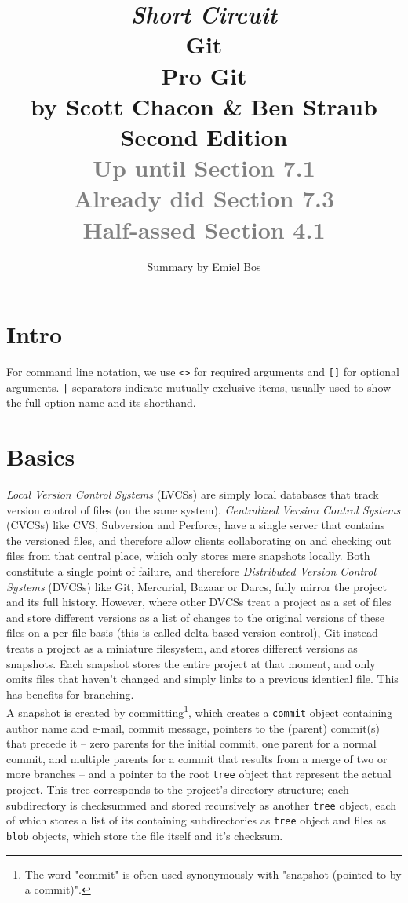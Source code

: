 \documentclass[8pt, table, xcdraw]{article}%
\title{
\textit{Short Circuit}\\
\vspace{15px}
\huge
Git\\
\vspace{20px}
\large
Pro Git\\
by Scott Chacon \& Ben Straub\\
Second Edition\\
\textcolor{gray}{Up until Section 7.1\\Already did Section 7.3\\Half-assed Section 4.1}
}
\author{Summary by Emiel Bos}
\date{}
\begin{document}
\maketitle

\section{Intro}

For command line notation, we use \lstinline{<>} for required arguments and \lstinline{[]} for optional arguments. \lstinline{|}-separators indicate mutually exclusive items, usually used to show the full option name and its shorthand.

\section{Basics}

\emph{Local Version Control Systems} (LVCSs) are simply local databases that track version control of files (on the same system). \emph{Centralized Version Control Systems} (CVCSs) like CVS, Subversion and Perforce, have a single server that contains the versioned files, and therefore allow clients collaborating on and checking out files from that central place, which only stores mere snapshots locally. Both constitute a single point of failure, and therefore \emph{Distributed Version Control Systems} (DVCSs) like Git, Mercurial, Bazaar or Darcs, fully mirror the project and its full history. However, where other DVCSs treat a project as a set of files and store different versions as a list of changes to the original versions of these files on a per-file basis (this is called delta-based version control), Git instead treats a project as a miniature filesystem, and stores different versions as snapshots. Each snapshot stores the entire project at that moment, and only omits files that haven't changed and simply links to a previous identical file. This has benefits for branching.\\
A snapshot is created by \hyperref[commit]{committing}\footnote{The word "commit" is often used synonymously with "snapshot (pointed to by a commit)".}, which creates a \lstinline{commit} object containing author name and e-mail, commit message, pointers to the (parent) commit(s) that precede it -- zero parents for the initial commit, one parent for a normal commit, and multiple parents for a commit that results from a merge of two or more branches -- and a pointer to the root \lstinline{tree} object that represent the actual project. This tree corresponds to the project's directory structure; each subdirectory is checksummed and stored recursively as another \lstinline{tree} object, each of which stores a list of its containing subdirectories as \lstinline{tree} object and files as \lstinline{blob} objects, which store the file itself and it's checksum.
\end{document}
